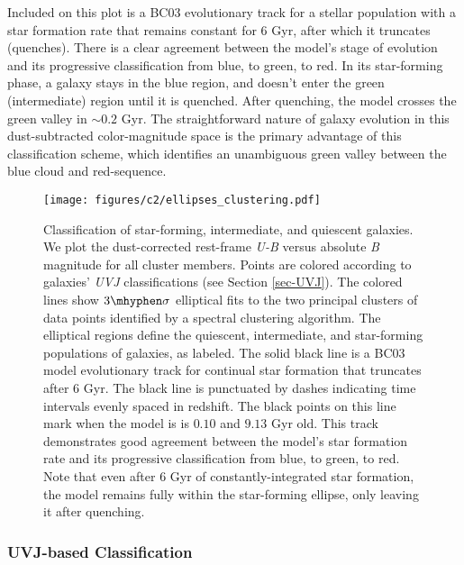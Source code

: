 Included on this plot is a BC03 evolutionary track for a stellar population with a star formation rate that remains constant for 6 Gyr, after which it truncates (quenches).
There is a clear agreement between the model's stage of evolution and its progressive classification from blue, to green, to red.
In its star-forming phase, a galaxy stays in the blue region, and doesn't enter the green (intermediate) region until it is quenched.
After quenching, the model crosses the green valley in $\sim0.2$ Gyr.
The straightforward nature of galaxy evolution in this dust-subtracted color-magnitude space is the primary advantage of this classification scheme, which identifies an unambiguous green valley between the blue cloud and red-sequence.


\begin{figure}[h!]
\centering \texttt{[image: figures/c2/ellipses\_clustering.pdf]}
\caption[Criteria for classifying star-forming, intermediate, and quiescent galaxies based on cuts in dust-corrected color-magnitude space]{Classification of star-forming, intermediate, and quiescent galaxies.
We plot the dust-corrected rest-frame \textit{U-B} versus absolute \textit{B} magnitude for all cluster members.
Points are colored according to galaxies' \textit{UVJ} classifications (see Section \ref{sec-UVJ}).
The colored lines show $3\mhyphen\sigma$ elliptical fits to the two principal clusters of data points identified by a spectral clustering algorithm.
The elliptical regions define the quiescent, intermediate, and star-forming populations of galaxies, as labeled.
The solid black line is a BC03 model evolutionary track for continual star formation that truncates after 6 Gyr.
The black line is punctuated by dashes indicating time intervals evenly spaced in redshift.
The black points on this line mark when the model is is $0.10$ and $9.13$ Gyr old.
This track demonstrates good agreement between the model's star formation rate and its progressive classification from blue, to green, to red.
Note that even after 6 Gyr of constantly-integrated star formation, the model remains fully within the star-forming ellipse, only leaving it after quenching.
\label{fig-ellipses}}
\end{figure}

\subsubsection{UVJ-based Classification}

